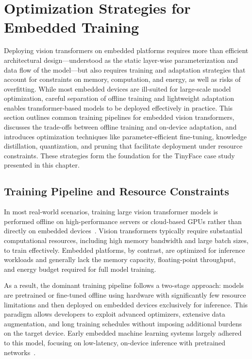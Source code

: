 \documentclass[runningheads,a4paper]{llncs}
\begin{document}
\section{Optimization Strategies for Embedded Training}\label{sec:optim}
Deploying vision transformers on embedded platforms requires more than efficient architectural design---understood as the static layer-wise parameterization and data flow of the model---but also requires training and adaptation strategies that account for constraints on memory, computation, and energy, as well as risks of overfitting. While most embedded devices are ill-suited for large-scale model optimization, careful separation of offline training and lightweight adaptation enables transformer-based models to be deployed effectively in practice. This section outlines common training pipelines for embedded vision transformers, discusses the trade-offs between offline training and on-device adaptation, and introduces optimization techniques like parameter-efficient fine-tuning, knowledge distillation, quantization, and pruning that facilitate deployment under resource constraints. These strategies form the foundation for the TinyFace case study presented in this chapter.

\subsection{Training Pipeline and Resource Constraints}
In most real-world scenarios, training large vision transformer models is performed offline on high-performance servers or cloud-based GPUs rather than directly on embedded devices~\cite{mlsys2023ondevice_chapter,ambient2025training_vs_inference}. Vision transformers typically require substantial computational resources, including high memory bandwidth and large batch sizes, to train effectively. Embedded platforms, by contrast, are optimized for inference workloads and generally lack the memory capacity, floating-point throughput, and energy budget required for full model training.

As a result, the dominant training pipeline follows a two-stage approach: models are pretrained or fine-tuned offline using hardware with significantly few resource limitations and then deployed on embedded devices exclusively for inference. This paradigm allows developers to exploit advanced optimizers, extensive data augmentation, and long training schedules without imposing additional burdens on the target device. Early embedded machine learning systems largely adhered to this model, focusing on low-latency, on-device inference with pretrained networks~\cite{mlsys2023ondevice_chapter}.
\end{document}
